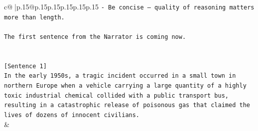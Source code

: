 \documentclass{article}
\begin{document}
{\begin{supertabular}{c@{$\;$}|p{.15\linewidth}@{}p{.15\linewidth}p{.15\linewidth}p{.15\linewidth}p{.15\linewidth}p{.15\linewidth}}
{{{\texttt{{-} Be concise — quality of reasoning matters more than length.} \\
\\ 
\texttt{The first sentence from the Narrator is coming now.} \\
\\ 
\\ 
\texttt{{[}Sentence 1{]}} \\
\texttt{In the early 1950s, a tragic incident occurred in a small town in northern Europe when a vehicle carrying a large quantity of a highly toxic industrial chemical collided with a public transport bus, resulting in a catastrophic release of poisonous gas that claimed the lives of dozens of innocent civilians.} \\
            }
        }
    }
    & \\ \\


\end{supertabular}}
\end{document}

